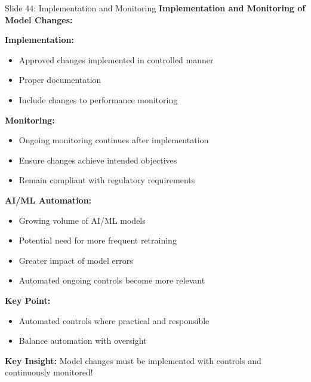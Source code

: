 \documentclass[8pt]{beamer}
\begin{document}
	\begin{frame}{Slide 44: Implementation and Monitoring}
		\fontsize{6.5}{7.5}\selectfont
		\textbf{Implementation and Monitoring of Model Changes:}
		
		\vspace{0.1cm}
		\textbf{Implementation:}
		\begin{itemize}
			\item Approved changes implemented in controlled manner
			\item Proper documentation
			\item Include changes to performance monitoring
		\end{itemize}
		
		\vspace{0.1cm}
		\textbf{Monitoring:}
		\begin{itemize}
			\item Ongoing monitoring continues after implementation
			\item Ensure changes achieve intended objectives
			\item Remain compliant with regulatory requirements
		\end{itemize}
		
		\vspace{0.1cm}
		\textbf{AI/ML Automation:}
		\begin{itemize}
			\item Growing volume of AI/ML models
			\item Potential need for more frequent retraining
			\item Greater impact of model errors
			\item Automated ongoing controls become more relevant
		\end{itemize}
		
		\vspace{0.1cm}
		\textbf{Key Point:}
		\begin{itemize}
			\item Automated controls where practical and responsible
			\item Balance automation with oversight
		\end{itemize}
		
		\textcolor{myblue}{\textbf{Key Insight:}} Model changes must be \textcolor{myblue}{implemented with controls and continuously monitored}!
	\end{frame}
	
\end{document}
